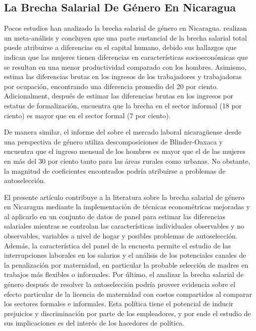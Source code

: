 \subsection{La Brecha Salarial De Género En Nicaragua}
Pocos estudios han analizado la brecha salarial de género en Nicaragua. \citet{Weichselbaumer2005} realizan un meta-análisis y concluyen que una parte sustancial de la brecha salarial total puede atribuirse a diferencias en el capital humano, debido sus hallazgos que indican que las mujeres tienen diferencias en características socioeconómicas que se resultan en una menor productividad comparado con los hombres. Asimismo, \citet{Monroy2008} estima las diferencias brutas en los ingresos de los trabajadores y trabajadoras por ocupación, encontrando una diferencia promedio del 20 por ciento. Adicionalment, después de estimar las diferencias brutas en los ingresos por estatus de formalización, encuentra que la brecha en el sector informal (18 por ciento) es mayor que en el sector formal (7 por ciento).

De manera similar, el informe del \citet{PNUD2014} sobre el mercado laboral nicaragüense desde una perspectiva de género utiliza descomposiciones de Blinder-Oaxaca y encuentra que el ingreso mensual de los hombres es mayor que el de las mujeres en más del 30 por ciento tanto para las áreas rurales como urbanas. No obstante, la magnitud de coeficientes encontrados podría atribuirse a problemas de autoselección.

El presente artículo contribuye a la literatura sobre la brecha salarial de género en Nicaragua mediante la implementación de técnicas econométricas mejoradas y al aplicarlo en un conjunto de datos de panel para estimar las diferencias salariales mientras se controlan las características individuales observables y no observables, variables a nivel de hogar y posibles problemas de autoselección. Además, la característica del panel de la encuesta permite el estudio de las interrupciones laborales en los salarios y el análisis de los potenciales canales de la penalización por maternidad, en particular la probable selección de madres en trabajos más flexibles o informales. Por último, el analizar la brecha salarial de género después de resolver la autoselección podría proveer evidencia sobre el efecto particular de la licencia de maternidad con costos compartidos al comparar los sectores formales e informales. Esta política tiene el potencial de inducir prejuicios y discriminación por parte de los empleadores, y por ende el estudio de sus implicaciones es del interés de los hacedores de política. 
